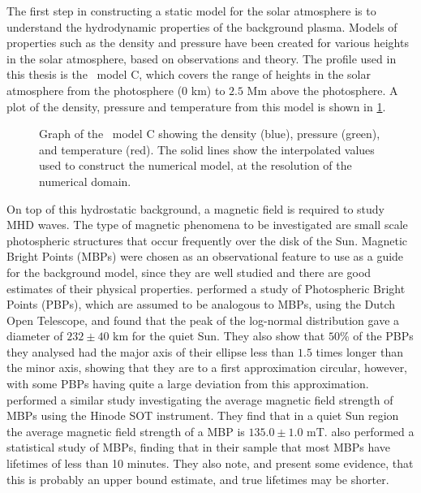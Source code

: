 \documentclass[a4paper,12pt,fourier,authoryear,custommargin]{Classes/PhDThesisPSnPDF}
\begin{document}
The first step in constructing a static model for the solar atmosphere is to understand the hydrodynamic properties of the background plasma.
Models of properties such as the density and pressure have been created for various heights in the solar atmosphere, based on observations and theory.
The profile used in this thesis is the~\cite{vernazza1981} model C, which covers the range of heights in the solar atmosphere from the photosphere ($0$ km) to $2.5$ Mm above the photosphere.
A plot of the density, pressure and temperature from this model is shown in \cref{fig:val3c}.



\begin{figure}[h]
    \centering
    \caption{Graph of the~\cite{vernazza1981} model C showing the density (blue), pressure (green), and temperature (red). The solid lines show the interpolated values used to construct the numerical model, at the resolution of the numerical domain.}
    \label{fig:val3c}
\end{figure}

On top of this hydrostatic background, a magnetic field is required to study MHD waves.
The type of magnetic phenomena to be investigated are small scale photospheric structures that occur frequently over the disk of the Sun.
Magnetic Bright Points (MBPs) were chosen as an observational feature to use as a guide for the background model, since they are well studied and there are good estimates of their physical properties.
\cite{feng2013} performed a study of Photospheric Bright Points (PBPs), which are assumed to be analogous to MBPs, using the Dutch Open Telescope, and found that the peak of the log-normal distribution gave a diameter of $232\pm40$ km for the quiet Sun.
They also show that $50$\% of the PBPs they analysed had the major axis of their ellipse less than $1.5$ times longer than the minor axis, showing that they are to a first approximation circular, however, with some PBPs having quite a large deviation from this approximation.
\cite{utz2013} performed a similar study investigating the average magnetic field strength of MBPs using the Hinode SOT instrument.
They find that in a quiet Sun region the average magnetic field strength of a MBP is $135.0 \pm 1.0$ mT.
\cite{sanchezalmeida2004} also performed a statistical study of MBPs, finding that in their sample that most MBPs have lifetimes of less than 10 minutes.
They also note, and present some evidence, that this is probably an upper bound estimate, and true lifetimes may be shorter.
\end{document}
